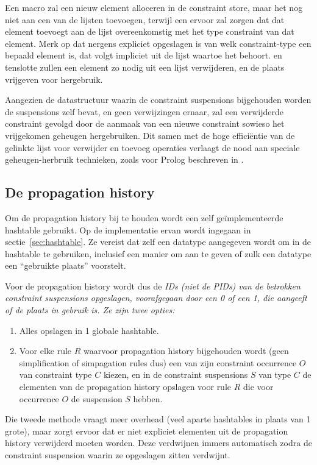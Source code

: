 Een  macro zal een nieuw element alloceren in de constraint store, maar het nog niet aan een van de lijsten toevoegen, terwijl een  ervoor zal zorgen dat dat element toevoegt aan de lijst overeenkomstig met het type constraint van dat element. Merk op dat nergens expliciet opgeslagen is van welk constraint-type een bepaald element is, dat volgt impliciet uit de lijst waartoe het behoort.  en  tenslotte zullen een element zo nodig uit een lijst verwijderen, en de plaats vrijgeven voor hergebruik.

Aangezien de datastructuur waarin de constraint suspensions bijgehouden worden de suspensions zelf bevat, en geen verwijzingen ernaar, zal een verwijderde constraint gevolgd door de aanmaak van een nieuwe constraint sowieso het vrijgekomen geheugen hergebruiken. Dit samen met de hoge effici\"entie van de gelinkte lijst voor verwijder en toevoeg operaties verlaagt de nood aan speciale geheugen-herbruik technieken, zoals voor Prolog beschreven in \cite{jon:memory_reuse}.

\subsection{De propagation history} \label{sec:prophist}


Om de propagation history bij te houden wordt een zelf ge\"implementeerde hashtable gebruikt. Op de implementatie ervan wordt ingegaan in sectie~\ref{sec:hashtable}. Ze vereist dat zelf een datatype aangegeven wordt om in de hashtable te gebruiken, inclusief een manier om aan te geven of zulk een datatype een ``gebruikte plaats'' voorstelt.

Voor de propagation history wordt dus de \em{ID}s (niet de \em{PID}s) van de betrokken constraint suspensions opgeslagen, voorafgegaan door een 0 of een 1, die aangeeft of de plaats in gebruik is. Ze zijn twee opties: \begin{enumerate}
  \item Alles opslagen in 1 globale hashtable.
  \item Voor elke rule $R$ waarvoor propagation history bijgehouden wordt (geen simplification of simpagation rules dus) een van zijn constraint occurrence $O$ van constraint type $C$ kiezen, en in de constraint suspensions $S$ van type $C$ de elementen van de propagation history opslagen voor rule $R$ die voor occurrence $O$ de suspension $S$ hebben.
\end{enumerate}
Die tweede methode vraagt meer overhead (veel aparte hashtables in plaats van 1 grote), maar zorgt ervoor dat er niet expliciet elementen uit de propagation history verwijderd moeten worden. Deze verdwijnen immers automatisch zodra de constraint suspension waarin ze opgeslagen zitten verdwijnt.

